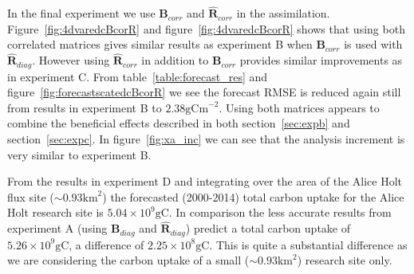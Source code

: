 \documentclass[11pt]{article}
\begin{document}
In the final experiment we use $\textbf{B}_{corr}$ and $\hat{\textbf{R}}_{corr}$ in the assimilation. Figure~\ref{fig:4dvaredcBcorR} and figure~\ref{fig:4dvaredcBcorR} shows that using both correlated matrices gives similar results as experiment B when $\textbf{B}_{corr}$ is used with $\hat{\textbf{R}}_{diag}$. However using $\hat{\textbf{R}}_{corr}$ in addition to $\textbf{B}_{corr}$ provides similar improvements as in experiment C. From table~\ref{table:forecast_res} and figure~\ref{fig:forecastscatedcBcorR} we see the forecast RMSE is reduced again still from results in experiment B to $2.38 \text{gCm}^{-2}$. Using both matrices appears to combine the beneficial effects described in both section~\ref{sec:expb} and section~\ref{sec:expc}. In figure~\ref{fig:xa_inc} we can see that the analysis increment is very similar to experiment B.
 
From the results in experiment D and integrating over the area of the Alice Holt flux site ($\sim 0.93\text{km}^2$) the forecasted (2000-2014) total carbon uptake for the Alice Holt research site is $5.04\times 10^9 \text{gC}$. In comparison the less accurate results from experiment A (using $\textbf{B}_{diag}$ and $\hat{\textbf{R}}_{diag}$) predict a total carbon uptake of $5.26 \times 10^9\text{gC}$, a difference of $2.25 \times 10^8\text{gC}$. This is quite a substantial difference as we are considering the carbon uptake of a small ($\sim 0.93\text{km}^2$) research site only.
\end{document}
